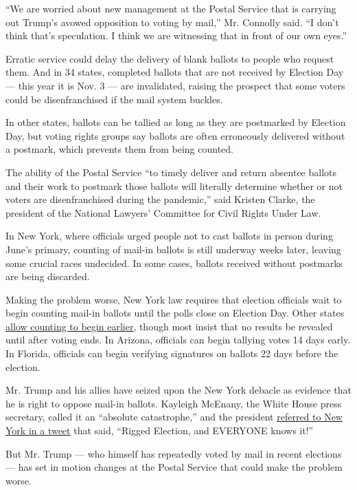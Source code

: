 ``We are worried about new management at the Postal Service that is
carrying out Trump's avowed opposition to voting by mail,'' Mr. Connolly
said. ``I don't think that's speculation. I think we are witnessing that
in front of our own eyes.''

Erratic service could delay the delivery of blank ballots to people who
request them. And in 34 states, completed ballots that are not received
by Election Day --- this year it is Nov. 3 --- are invalidated, raising
the prospect that some voters could be disenfranchised if the mail
system buckles.

In other states, ballots can be tallied as long as they are postmarked
by Election Day, but voting rights groups say ballots are often
erroneously delivered without a postmark, which prevents them from being
counted.

The ability of the Postal Service ``to timely deliver and return
absentee ballots and their work to postmark those ballots will literally
determine whether or not voters are disenfranchised during the
pandemic,'' said Kristen Clarke, the president of the National Lawyers'
Committee for Civil Rights Under Law.

In New York, where officials urged people not to cast ballots in person
during June's primary, counting of mail-in ballots is still underway
weeks later, leaving some crucial races undecided. In some cases,
ballots received without postmarks are being discarded.

Making the problem worse, New York law requires that election officials
wait to begin counting mail-in ballots until the polls close on Election
Day. Other states
\href{https://www.ncsl.org/research/elections-and-campaigns/vopp-table-16-when-absentee-mail-ballot-processing-and-counting-can-begin.aspx}{allow
counting to begin earlier}, though most insist that no results be
revealed until after voting ends. In Arizona, officials can begin
tallying votes 14 days early. In Florida, officials can begin verifying
signatures on ballots 22 days before the election.

Mr. Trump and his allies have seized upon the New York debacle as
evidence that he is right to oppose mail-in ballots. Kayleigh McEnany,
the White House press secretary, called it an ``absolute catastrophe,''
and the president
\href{https://twitter.com/realDonaldTrump/status/1287554056727040008?s=20}{referred
to New York in a tweet} that said, ``Rigged Election, and EVERYONE knows
it!''

But Mr. Trump --- who himself has repeatedly voted by mail in recent
elections --- has set in motion changes at the Postal Service that could
make the problem worse.

